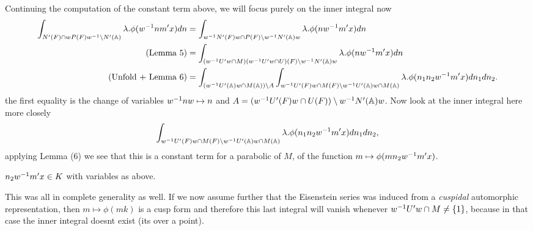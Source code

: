     Continuing the computation of the constant term above, we will focus purely on the inner integral now
    \begin{equation*}
        \begin{aligned}
            \int_{N'(F)\cap wP(F)w\inv \setminus N'(\A)} \lambda.\phi( w\inv nm' x)  dn &= \int_{w\inv N'(F)w \cap P(F) \setminus w\inv N'(\A)w} \lambda.\phi( nw\inv m' x)  dn \\
            (\text{Lemma 5})&= \int_{(w\inv U' w \cap M)(w\inv U' w \cap U)(F) \setminus w\inv N'(\A)w} \lambda.\phi( nw\inv m' x)  dn \\
            (\text{Unfold + Lemma 6})  &= \int_{(w\inv U'(\A)w \cap M(\A)) \setminus A} \int_{w\inv U'(F) w \cap M(F) \setminus w\inv U'(\A)w \cap M(\A)} \lambda.\phi( n_1 n_2 w\inv m' x)  dn_1 dn_2. \\
        \end{aligned}
    \end{equation*}
    the first equality is the change of variables \(w^{-1} n w\mapsto n \) and \(A = (w\inv U'(F) w \cap U(F) ) \setminus w\inv N'(\A)w \). Now look at the inner integral here more closely 
    \[ \int_{w\inv U'(F) w \cap M(F) \setminus w\inv U'(\A)w \cap M(\A)}\lambda. \phi( n_1 n_2 w\inv m' x)  dn_1 dn_2,\]
    applying Lemma (6) we see that this is a constant term for a parabolic of \(M\), of the function \(m\mapsto \phi(m n_2 w\inv m' x)\). 
    \begin{Lemma}
        \(n_2 w^{-1} m' x \in K\) with variables as above.
    \end{Lemma}
    This was all in complete generality as well. If we now assume further that the Eisenstein series was induced from a \textit{cuspidal} automorphic representation, then \(m\mapsto \phi(mk)\) is a cusp form and therefore this last integral will vanish whenever \(w^{-1} U'w \cap M \neq \{1\}\), because in that case the inner integral doesnt exist (its over a point).

